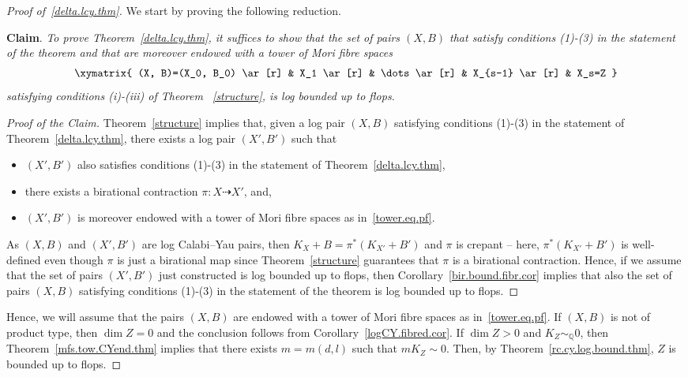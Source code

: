 \documentclass[11pt]{ip-journal}
\theoremstyle{definition}
\begin{document}
\begin{proof}[Proof of~\ref{delta.lcy.thm}]
We start by proving the following reduction.

\medskip

{\bf Claim}.
{\it 
To prove Theorem~\ref{delta.lcy.thm}, it suffices to show that the set of pairs
$(X, B)$ 
that satisfy conditions (1)-(3) in the statement of the theorem and that are moreover endowed with a tower of Mori fibre spaces
\begin{align}
\label{tower.eq.pf}
\xymatrix{
 (X, B)=(X_0, B_0) \ar[r] & X_1 \ar[r] & \dots \ar[r] & X_{s-1} \ar[r] & X_s=Z
 }
\end{align}
satisfying conditions (i)-(iii) of Theorem ~\ref{structure},
is log bounded up to flops.
}
\begin{proof}[Proof of the Claim]
Theorem~\ref{structure} implies that, given a log pair 
$(X, B)$ 
satisfying conditions (1)-(3) in the statement of Theorem~\ref{delta.lcy.thm}, there exists a log pair 
$(X', B')$ 
such that 
\begin{itemize}
    \item 
$(X', B')$ 
also satisfies conditions (1)-(3) in the statement of Theorem~\ref{delta.lcy.thm},
    \item 
there exists a birational contraction 
$\pi \colon X \dashrightarrow X'$, 
and,
    \item 
$(X', B')$ 
is moreover endowed with a tower of Mori fibre spaces as in~\eqref{tower.eq.pf}.
\end{itemize}
As 
$(X, B)$ 
and 
$(X', B')$ 
are log Calabi--Yau pairs, then 
$K_X+B=\pi^\ast (K_{X'}+B')$ 
and 
$\pi$ 
is crepant -- here, 
$\pi^\ast(K_{X'}+B')$
is well-defined even though 
$\pi$ 
is just a birational map since Theorem~\ref{structure} guarantees that 
$\pi$ 
is a birational contraction. 
Hence, 
if we assume that the set of pairs 
$(X', B')$
just constructed is log bounded up to flops, then Corollary~\ref{bir.bound.fibr.cor} implies that also the set of pairs 
$(X, B)$ 
satisfying conditions (1)-(3) in the statement of the theorem is log bounded up to flops.
\end{proof}
Hence, we will assume that the pairs $(X, B)$ are endowed with a tower of Mori fibre spaces as in~\eqref{tower.eq.pf}. 
If $(X, B)$ is not of product type, then $\dim Z=0$ and the conclusion follows from Corollary~\ref{logCY.fibred.cor}.
If $\dim Z >0$ and $K_Z \sim_\mathbb{Q} 0$, then Theorem~\ref{mfs.tow.CYend.thm} implies that there exists $m=m(d, l)$ such that $mK_Z \sim 0$.
Then, by Theorem~\ref{rc.cy.log.bound.thm}, $Z$ is bounded up to flops.

\end{proof}
\end{document}
